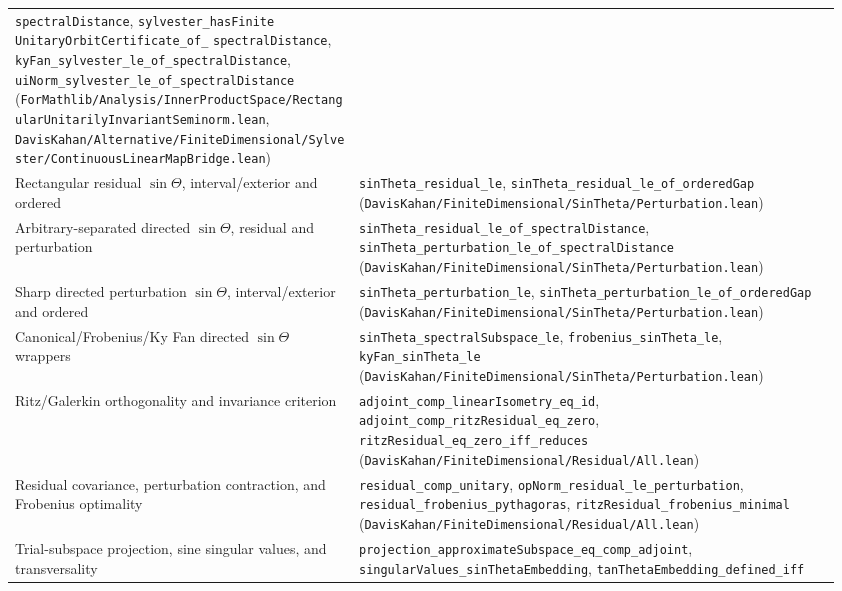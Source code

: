 \documentclass[11pt]{article}
\theoremstyle{remark}
\begin{document}
\begin{center}
\begin{tabular}{@{}p{0.40\linewidth}p{0.56\linewidth}@{}}
      \texttt{spectralDistance},
    \texttt{sylvester\_hasFinite}\allowbreak
      \texttt{UnitaryOrbitCertificate\_of\_}\allowbreak
      \texttt{spectralDistance},
    \texttt{kyFan\_sylvester\_le\_of\_}\allowbreak\texttt{spectralDistance},
    \texttt{uiNorm\_sylvester\_le\_of\_}\allowbreak\texttt{spectralDistance}
    (\texttt{ForMathlib/Analysis/InnerProductSpace/RectangularUnitarilyInvariantSeminorm.lean},
     \texttt{DavisKahan/Alternative/FiniteDimensional/Sylvester/ContinuousLinearMapBridge.lean}) \\
Rectangular residual $\sin\Theta$, interval/exterior and ordered
  & \texttt{sinTheta\_residual\_le},
    \texttt{sinTheta\_residual\_le\_of\_orderedGap}
    (\texttt{DavisKahan/FiniteDimensional/SinTheta/Perturbation.lean}) \\
Arbitrary-separated directed $\sin\Theta$, residual and perturbation
  & \texttt{sinTheta\_residual\_le\_of\_}\allowbreak\texttt{spectralDistance},
    \texttt{sinTheta\_perturbation\_le\_of\_}\allowbreak\texttt{spectralDistance}
    (\texttt{DavisKahan/FiniteDimensional/SinTheta/Perturbation.lean}) \\
Sharp directed perturbation $\sin\Theta$, interval/exterior and ordered
  & \texttt{sinTheta\_perturbation\_le},
    \texttt{sinTheta\_perturbation\_le\_of\_orderedGap}
    (\texttt{DavisKahan/FiniteDimensional/SinTheta/Perturbation.lean}) \\
Canonical/Frobenius/Ky Fan directed $\sin\Theta$ wrappers
  & \texttt{sinTheta\_spectralSubspace\_le},
    \texttt{frobenius\_sinTheta\_le},
    \texttt{kyFan\_sinTheta\_le}
    (\texttt{DavisKahan/FiniteDimensional/SinTheta/Perturbation.lean}) \\
Ritz/Galerkin orthogonality and invariance criterion
  & \texttt{adjoint\_comp\_linearIsometry\_eq\_id},
    \texttt{adjoint\_comp\_ritzResidual\_eq\_zero},
    \texttt{ritzResidual\_eq\_zero\_iff\_reduces}
    (\texttt{DavisKahan/FiniteDimensional/Residual/All.lean}) \\
Residual covariance, perturbation contraction, and Frobenius optimality
  & \texttt{residual\_comp\_unitary},
    \texttt{opNorm\_residual\_le\_perturbation},
    \texttt{residual\_frobenius\_pythagoras},
    \texttt{ritzResidual\_frobenius\_minimal}
    (\texttt{DavisKahan/FiniteDimensional/Residual/All.lean}) \\
Trial-subspace projection, sine singular values, and transversality
  & \texttt{projection\_approximateSubspace\_eq\_comp\_adjoint},
    \texttt{singularValues\_sinThetaEmbedding},
    \texttt{tanThetaEmbedding\_defined\_iff}

\end{tabular}
\end{center}
\end{document}

